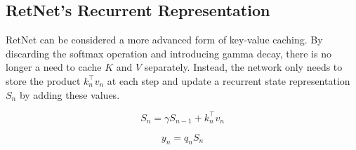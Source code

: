 \documentclass[times, review, 10pt]{elsarticle}
\begin{document}
\subsection{RetNet's Recurrent Representation}

RetNet can be considered a more advanced form of key-value caching. By discarding the softmax operation and introducing gamma decay, there is no longer a need to cache \(K\) and \(V\) separately. Instead, the network only needs to store the product \(k_n^{\top} v_n\) at each step and update a recurrent state representation \(S_n\) by adding these values.

\begin{equation}
\label{eq:app-retrec-state}
S_n = \gamma S_{n-1} + k_n^{\top} v_n
\end{equation}

\begin{equation}
\label{eq:app-retrec-yn}
y_n = q_n S_n
\end{equation}
\end{document}
